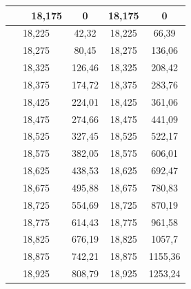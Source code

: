 \documentclass[12pt,a4paper]{article}
\begin{document}
\begin{table}[h!]
\begin{center}
\begin{tabular}{|p{3cm}|p{3cm}||p{3cm}p{3cm}|}
$\quad \quad \, $18,175 & \multicolumn{1}{|c|}{0}       & \multicolumn{1}{|c|}{18,175} & \multicolumn{1}{|c|}{0}       \\ \hline
\multicolumn{1}{|c|}{18,225} & \multicolumn{1}{|c|}{42,32}   & \multicolumn{1}{|c|}{18,225} & \multicolumn{1}{|c|}{66,39}   \\ \hline
\multicolumn{1}{|c|}{18,275} & \multicolumn{1}{|c|}{80,45}   & \multicolumn{1}{|c|}{18,275} & \multicolumn{1}{|c|}{136,06}  \\ \hline
\multicolumn{1}{|c|}{18,325} & \multicolumn{1}{|c|}{126,46}  & \multicolumn{1}{|c|}{18,325} & \multicolumn{1}{|c|}{208,42}  \\ \hline
\multicolumn{1}{|c|}{18,375} & \multicolumn{1}{|c|}{174,72}  & \multicolumn{1}{|c|}{18,375} & \multicolumn{1}{|c|}{283,76}  \\ \hline
\multicolumn{1}{|c|}{18,425} & \multicolumn{1}{|c|}{224,01}  & \multicolumn{1}{|c|}{18,425} & \multicolumn{1}{|c|}{361,06}  \\ \hline
\multicolumn{1}{|c|}{18,475} & \multicolumn{1}{|c|}{274,66}  & \multicolumn{1}{|c|}{18,475} & \multicolumn{1}{|c|}{441,09}  \\ \hline
\multicolumn{1}{|c|}{18,525} & \multicolumn{1}{|c|}{327,45}  & \multicolumn{1}{|c|}{18,525} & \multicolumn{1}{|c|}{522,17}  \\ \hline
\multicolumn{1}{|c|}{18,575} & \multicolumn{1}{|c|}{382,05}  & \multicolumn{1}{|c|}{18,575} & \multicolumn{1}{|c|}{606,01}  \\ \hline
\multicolumn{1}{|c|}{18,625} & \multicolumn{1}{|c|}{438,53}  & \multicolumn{1}{|c|}{18,625} & \multicolumn{1}{|c|}{692,47}  \\ \hline
\multicolumn{1}{|c|}{18,675} & \multicolumn{1}{|c|}{495,88}  & \multicolumn{1}{|c|}{18,675} & \multicolumn{1}{|c|}{780,83}  \\ \hline
\multicolumn{1}{|c|}{18,725} & \multicolumn{1}{|c|}{554,69}  & \multicolumn{1}{|c|}{18,725} & \multicolumn{1}{|c|}{870,19}  \\ \hline
\multicolumn{1}{|c|}{18,775} & \multicolumn{1}{|c|}{614,43}  & \multicolumn{1}{|c|}{18,775} & \multicolumn{1}{|c|}{961,58}  \\ \hline
\multicolumn{1}{|c|}{18,825} & \multicolumn{1}{|c|}{676,19}  & \multicolumn{1}{|c|}{18,825} & \multicolumn{1}{|c|}{1057,7}  \\ \hline
\multicolumn{1}{|c|}{18,875} & \multicolumn{1}{|c|}{742,21}  & \multicolumn{1}{|c|}{18,875} & \multicolumn{1}{|c|}{1155,36} \\ \hline
\multicolumn{1}{|c|}{18,925} & \multicolumn{1}{|c|}{808,79}  & \multicolumn{1}{|c|}{18,925} & \multicolumn{1}{|c|}{1253,24} \\ \hline



\end{tabular}
\end{center}
\end{table}
\end{document}
